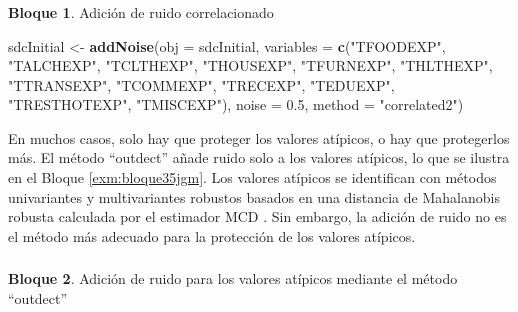 \documentclass[]{book}
\newenvironment{Shaded}{\begin{snugshade}}{\end{snugshade}}
\newcommand{\DataTypeTok}[1]{\textcolor[rgb]{0.13,0.29,0.53}{#1}}
\newcommand{\FloatTok}[1]{\textcolor[rgb]{0.00,0.00,0.81}{#1}}
\newcommand{\KeywordTok}[1]{\textcolor[rgb]{0.13,0.29,0.53}{\textbf{#1}}}
\newcommand{\NormalTok}[1]{#1}
\newcommand{\StringTok}[1]{\textcolor[rgb]{0.31,0.60,0.02}{#1}}
\theoremstyle{definition}
\theoremstyle{definition}
\newtheorem{example}{Bloque}[chapter]
\theoremstyle{definition}
\theoremstyle{definition}
\theoremstyle{remark}
\begin{document}
\hypertarget{section-8}{%
\subsubsection{}\label{section-8}}

\begin{example}
\protect\hypertarget{exm:bloque34jgm}{}{\label{exm:bloque34jgm} }Adición de ruido correlacionado
\end{example}

\begin{Shaded}
\begin{Highlighting}[]
\NormalTok{sdcInitial <-}\StringTok{ }\KeywordTok{addNoise}\NormalTok{(}\DataTypeTok{obj =}\NormalTok{ sdcInitial, }\DataTypeTok{variables =} \KeywordTok{c}\NormalTok{(}\StringTok{"TFOODEXP"}\NormalTok{, }\StringTok{"TALCHEXP"}\NormalTok{, }\StringTok{"TCLTHEXP"}\NormalTok{, }\StringTok{"THOUSEXP"}\NormalTok{, }
                                                       \StringTok{"TFURNEXP"}\NormalTok{, }\StringTok{"THLTHEXP"}\NormalTok{, }\StringTok{"TTRANSEXP"}\NormalTok{, }\StringTok{"TCOMMEXP"}\NormalTok{, }
                                                       \StringTok{"TRECEXP"}\NormalTok{, }\StringTok{"TEDUEXP"}\NormalTok{, }\StringTok{"TRESTHOTEXP"}\NormalTok{, }\StringTok{"TMISCEXP"}\NormalTok{), }
                       \DataTypeTok{noise =} \FloatTok{0.5}\NormalTok{, }\DataTypeTok{method =} \StringTok{"correlated2"}\NormalTok{)}
\end{Highlighting}
\end{Shaded}

En muchos casos, solo hay que proteger los valores atípicos, o hay que protegerlos más. El método ``outdect'' añade ruido solo a los valores atípicos, lo que se ilustra en el Bloque \ref{exm:bloque35jgm}. Los valores atípicos se identifican con métodos univariantes y multivariantes robustos basados en una distancia de Mahalanobis robusta calculada por el estimador MCD \citep{TMKC14}. Sin embargo, la adición de ruido no es el método más adecuado para la protección de los valores atípicos.

\hypertarget{section-9}{%
\subsubsection{}\label{section-9}}

\begin{example}
\protect\hypertarget{exm:bloque35jgm}{}{\label{exm:bloque35jgm} }Adición de ruido para los valores atípicos mediante el método ``outdect''
\end{example}
\end{document}
